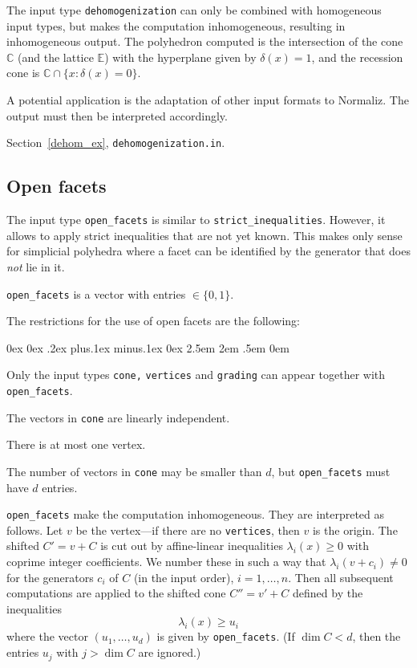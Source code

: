 \documentclass[12pt,a4paper]{scrartcl}
\newcounter{listi}
\newcommand{\stdli}{ \topsep0ex \partopsep0ex %
\parsep.2ex plus.1ex minus.1ex \itemsep0ex%
\leftmargin2.5em \labelwidth2em \labelsep.5em \rightmargin0em}%
\newenvironment{arab}{\begin{list}{\textup{(\arabic{listi})}}%
	{\usecounter{listi}\stdli}}{\end{list}}
\theoremstyle{definition}
\def\CC{{\mathbb C}}
\def\EE{{\mathbb E}}
\begin{document}
The input type \verb|dehomogenization| can only be combined with homogeneous input types, but makes the computation inhomogeneous, resulting in inhomogeneous output. The polyhedron computed is the intersection of the cone $\CC$ (and the lattice $\EE$) with the hyperplane given by $\delta(x)=1$, and the recession cone is $\CC\cap\{x:\delta(x)=0\}$.

A potential application is the adaptation of other input formats to Normaliz. The output must then be interpreted accordingly.

Section~\ref{dehom_ex}, \verb|dehomogenization.in|.

\subsection{Open facets}\label{open_facets}

The input type \verb|open_facets| is similar to \verb|strict_inequalities|. However, it allows to apply strict inequalities that are not yet known. This makes only sense for simplicial polyhedra where a facet can be identified by the generator that does \emph{not} lie in it.

\verb|open_facets| is a vector with entries $\in \{0,1\}$.

The restrictions for the use of open facets are the following:
\begin{arab}
	\item Only the input types \verb|cone,| \verb|vertices| and \verb|grading| can appear together with \verb|open_facets|.
	\item The vectors in \verb|cone| are linearly independent.
	\item There is at most one vertex.
\end{arab}
The number of vectors in \verb|cone| may be smaller than $d$, but \verb|open_facets| must have $d$ entries.


\verb|open_facets| make the computation inhomogeneous. They are interpreted as follows. Let $v$ be the vertex---if there are no \verb|vertices|, then $v$ is the origin. The shifted $C'=v+C$ is cut out by affine-linear inequalities $\lambda_i(x)\ge 0$ with coprime integer coefficients. We number these in such a way that $\lambda_i(v+c_i)\neq 0$ for the generators $c_i$ of $C$ (in the input order), $i=1,\dots,n$. Then all subsequent computations are applied to the shifted cone $C''=v'+C$ defined by the inequalities
$$
\lambda_i(x)\ge u_i
$$
where the vector $(u_1,\dots,u_d)$ is given by \verb|open_facets|. (If $\dim C<d$, then the entries $u_j$ with $j> \dim C$ are ignored.)
\end{document}
